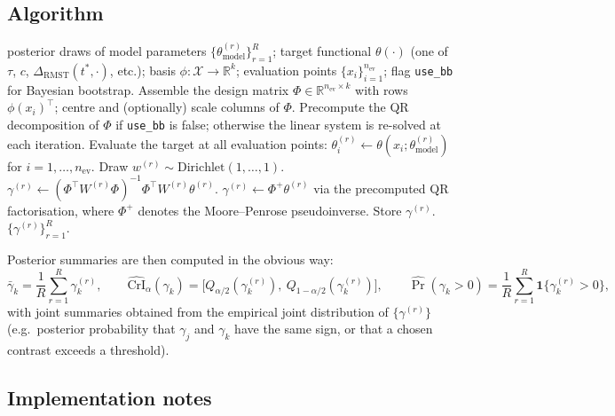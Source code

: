 \documentclass[11pt]{article}
\theoremstyle{plain}
\theoremstyle{definition}
\theoremstyle{remark}
\newcommand{\1}{\mathds{1}}
\newcommand{\tauf}{\tau}
\newcommand{\cf}{c}
\newcommand{\RMST}{\mathrm{RMST}}
\begin{document}
\subsection{Algorithm}

\begin{algorithm}[h]
\caption{Posterior projection summary}
\label{alg:projection}
\begin{algorithmic}[1]
\Require posterior draws of model parameters $\{\theta_{\text{model}}^{(r)}\}_{r=1}^{R}$;
target functional $\theta(\cdot)$ (one of $\tauf$, $\cf$,
$\Delta_{\RMST}(t^{*}, \cdot)$, etc.);
basis $\phi : \mathcal{X} \to \mathbb{R}^{k}$;
evaluation points $\{x_{i}\}_{i=1}^{n_{\mathrm{ev}}}$;
flag \texttt{use\_bb} for Bayesian bootstrap.
\Statex
\State Assemble the design matrix $\Phi \in \mathbb{R}^{n_{\mathrm{ev}} \times k}$
with rows $\phi(x_{i})^{\top}$; centre and (optionally) scale columns of
$\Phi$.
\State Precompute the QR decomposition of $\Phi$ if \texttt{use\_bb} is
false; otherwise the linear system is re-solved at each iteration.
  \State Evaluate the target at all evaluation points:
         $\theta^{(r)}_{i} \gets \theta(x_{i}; \theta_{\text{model}}^{(r)})$
         for $i = 1, \ldots, n_{\mathrm{ev}}$.
    \State Draw $w^{(r)} \sim \mathrm{Dirichlet}(1, \ldots, 1)$.
    \State $\gamma^{(r)} \gets (\Phi^{\top} W^{(r)} \Phi)^{-1}
                                \Phi^{\top} W^{(r)} \theta^{(r)}$.
  \Else
    \State $\gamma^{(r)} \gets \Phi^{+} \theta^{(r)}$ via the
           precomputed QR factorisation, where $\Phi^{+}$ denotes the
           Moore--Penrose pseudoinverse.
  \EndIf
  \State Store $\gamma^{(r)}$.
\EndFor
\State \Return $\{\gamma^{(r)}\}_{r=1}^{R}$.
\end{algorithmic}
\end{algorithm}

Posterior summaries are then computed in the obvious way:
\[
  \bar{\gamma}_{k} = \frac{1}{R}\sum_{r=1}^{R}\gamma_{k}^{(r)},
  \qquad
  \widehat{\mathrm{CrI}}_{\alpha}(\gamma_{k}) =
  \bigl[Q_{\alpha/2}(\gamma_{k}^{(r)}),\ Q_{1-\alpha/2}(\gamma_{k}^{(r)})\bigr],
  \qquad
  \widehat{\Pr}(\gamma_{k} > 0) = \frac{1}{R}\sum_{r=1}^{R}
  \mathbf{1}\{\gamma_{k}^{(r)} > 0\},
\]
with joint summaries obtained from the empirical joint distribution of
$\{\gamma^{(r)}\}$ (e.g.\ posterior probability that $\gamma_{j}$ and
$\gamma_{k}$ have the same sign, or that a chosen contrast exceeds a
threshold).

\subsection{Implementation notes}
\end{document}
